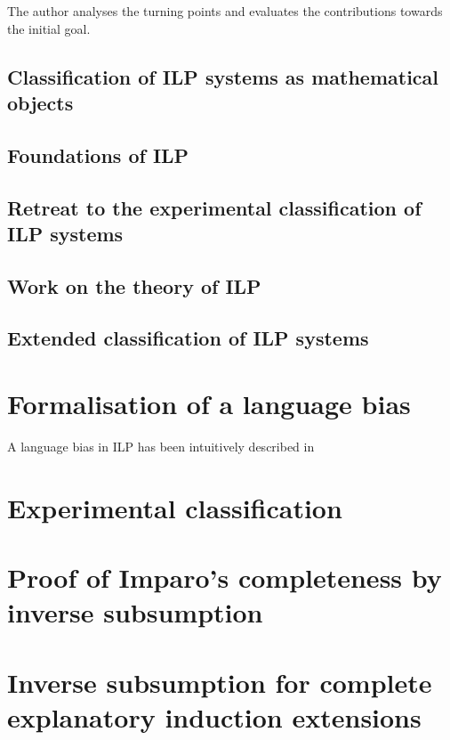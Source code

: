 The author analyses the turning points and evaluates the contributions towards the initial goal.

\subsection{Classification of ILP systems as mathematical objects}
\subsection{Foundations of ILP}
\subsection{Retreat to the experimental classification of ILP systems}
\subsection{Work on the theory of ILP}
\subsection{Extended classification of ILP systems}

\section{Formalisation of a language bias}
A language bias in ILP has been intuitively described in 
\section{Experimental classification}
\section{Proof of Imparo's completeness by inverse subsumption}
\section{Inverse subsumption for complete explanatory induction extensions}